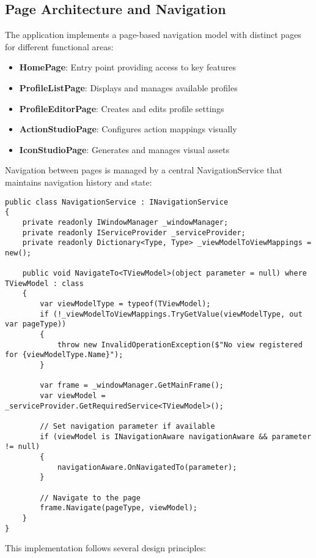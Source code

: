 \subsection{Page Architecture and Navigation}
The application implements a page-based navigation model with distinct pages for different functional areas:

\begin{itemize}
    \item \textbf{HomePage}: Entry point providing access to key features
    \item \textbf{ProfileListPage}: Displays and manages available profiles
    \item \textbf{ProfileEditorPage}: Creates and edits profile settings
    \item \textbf{ActionStudioPage}: Configures action mappings visually
    \item \textbf{IconStudioPage}: Generates and manages visual assets
\end{itemize}

Navigation between pages is managed by a central NavigationService that maintains navigation history and state:

\begin{verbatim}
public class NavigationService : INavigationService
{
    private readonly IWindowManager _windowManager;
    private readonly IServiceProvider _serviceProvider;
    private readonly Dictionary<Type, Type> _viewModelToViewMappings = new();
    
    public void NavigateTo<TViewModel>(object parameter = null) where TViewModel : class
    {
        var viewModelType = typeof(TViewModel);
        if (!_viewModelToViewMappings.TryGetValue(viewModelType, out var pageType))
        {
            throw new InvalidOperationException($"No view registered for {viewModelType.Name}");
        }
        
        var frame = _windowManager.GetMainFrame();
        var viewModel = _serviceProvider.GetRequiredService<TViewModel>();
        
        // Set navigation parameter if available
        if (viewModel is INavigationAware navigationAware && parameter != null)
        {
            navigationAware.OnNavigatedTo(parameter);
        }
        
        // Navigate to the page
        frame.Navigate(pageType, viewModel);
    }
}
\end{verbatim}

This implementation follows several design principles:

